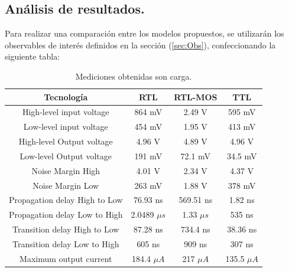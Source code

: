 \subsection{Análisis de resultados.}
Para realizar una comparación entre los modelos propuestos, se utilizarán los observables de interés definidos en la sección (\ref{sec:Obs}), confeccionando la siguiente tabla:
\begin{table}[H]
\centering
\begin{tabular}{cccc}
\hline
\multicolumn{1}{c}{\textbf{Tecnología}} & \textbf{RTL}   & \textbf{RTL-MOS} & \multicolumn{1}{c}{\textbf{TTL}} \\ \hline
High-level input voltage                  & 864 mV         & 2.49 V           & 595 mV                            \\
Low-level input voltage                   & 454 mV         & 1.95 V           & 413 mV                            \\
High-level Output voltage                 & 4.96 V         & 4.89 V           & 4.96 V                            \\
Low-level Output voltage                  & 191 mV         & 72.1 mV          & 34.5 mV                            \\
Noise Margin High                         & 4.01 V         & 2.34 V           & 4.37 V                            \\
Noise Margin Low                          & 263 mV         & 1.88 V           & 378 mV                            \\
Propagation delay High to Low             & 76.93 ns       & 569.51 ns        & 1.82 ns                           \\
Propagation delay Low to High             & 2.0489 $\mu s$ & 1.33 $\mu s$     & 535 ns                            \\
Transition delay High to Low              & 87.28 ns       & 734.4 ns         & 38.36 ns                          \\
Transition delay Low to High              & 605 ns         & 909 ns           & 307 ns                            \\
Maximum output current                    & 184.4  $\mu A$ &    217 $\mu A$              &                                  135.5 $\mu A$ 	\\
\hline
\end{tabular}
\caption{Mediciones obtenidas son carga.}
\end{table}
